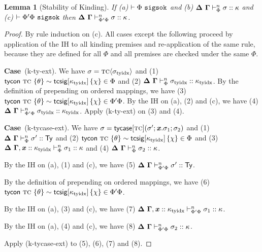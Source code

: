 \documentclass[12pt]{article}
\newtheorem{lemma}{Lemma}
\newcommand{\pfcase}[1]{\textbf{Case}~#1. }
\begin{document}
\begin{lemma}[Stability of Kinding]
\label{lemma:stability-of-kinding}
If (a) $\vdash \Phi~\mathtt{sigsok}$ and (b) $\boldsymbol\Delta~\boldsymbol\Gamma \vdash_{\Phi}^{n} \sigma :: \kappa$ and (c) $\vdash \Phi'\Phi~\mathtt{sigsok}$  then $\boldsymbol\Delta~\boldsymbol\Gamma \vdash_{\Phi'\Phi}^{n} \sigma :: \kappa$.
\end{lemma}
\begin{proof} By rule induction on (c). All cases except the following proceed by  application of the IH to all kinding premises and re-application of the same rule, because they are defined for all $\Phi$ and all premises are checked under the same $\Phi$.


\pfcase{(k-ty-ext)} We have $\sigma={\textsc{tc}}\langle\sigma_\text{tyidx}\rangle$ and (1) ${\sf tycon}~\textsc{tc} ~\{\theta\} \sim {\sf tcsig}[\kappa_\text{tyidx}]\,\{\chi\} \in \Phi$ and (2) $\boldsymbol\Delta~\boldsymbol\Gamma \vdash_{\Phi}^{n} \sigma_\text{tyidx} :: \kappa_\text{tyidx}$. By the definition of prepending on ordered mappings, we have (3) ${\sf tycon}~\textsc{tc} ~\{\theta\} \sim {\sf tcsig}[\kappa_\text{tyidx}]\,\{\chi\} \in \Phi'\Phi$. By the IH on (a), (2) and (c), we have (4) $\boldsymbol\Delta~\boldsymbol\Gamma \vdash_{\Phi'\Phi}^{n} \sigma_\text{tyidx} :: \kappa_\text{tyidx}$. Apply (k-ty-ext) on (3) and (4). 

\pfcase{(k-tycase-ext)} We have $\sigma={\sf tycase}[\textsc{tc}](\sigma'; {\textbf{\textit{x}}}.\sigma_1; \sigma_2)$ and (1) $\boldsymbol\Delta~\boldsymbol\Gamma \vdash_{\Phi}^{n} \sigma' :: {\sf Ty}$ and (2) ${\sf tycon}~\textsc{tc} ~\{\theta\} \sim {\sf tcsig}[\kappa_\text{tyidx}]\,\{\chi\} \in \Phi$ and (3) $\boldsymbol\Delta~\boldsymbol\Gamma, {\textbf{\textit{x}}} :: \kappa_\text{tyidx} \vdash_{\Phi}^{n} \sigma_1 :: \kappa$ and (4) $\boldsymbol\Delta~\boldsymbol\Gamma \vdash_{\Phi}^{n} \sigma_2 :: \kappa$.

By the IH on (a), (1) and (c), we have (5) $\boldsymbol\Delta~\boldsymbol\Gamma \vdash_{\Phi'\Phi}^{n} \sigma' :: {\sf Ty}$.

By the definition of prepending on ordered mappings, we have (6) ${\sf tycon}~\textsc{tc} ~\{\theta\} \sim {\sf tcsig}[\kappa_\text{tyidx}]\,\{\chi\} \in \Phi'\Phi$. 

By the IH on (a), (3) and (c), we have (7)  $\boldsymbol\Delta~\boldsymbol\Gamma, {\textbf{\textit{x}}} :: \kappa_\text{tyidx} \vdash_{\Phi'\Phi}^{n} \sigma_1 :: \kappa$.

By the IH on (a), (4) and (c), we have (8) $\boldsymbol\Delta~\boldsymbol\Gamma \vdash_{\Phi'\Phi}^{n} \sigma_2 :: \kappa$.

Apply (k-tycase-ext) to (5), (6), (7) and (8).
\end{proof}
\end{document}
